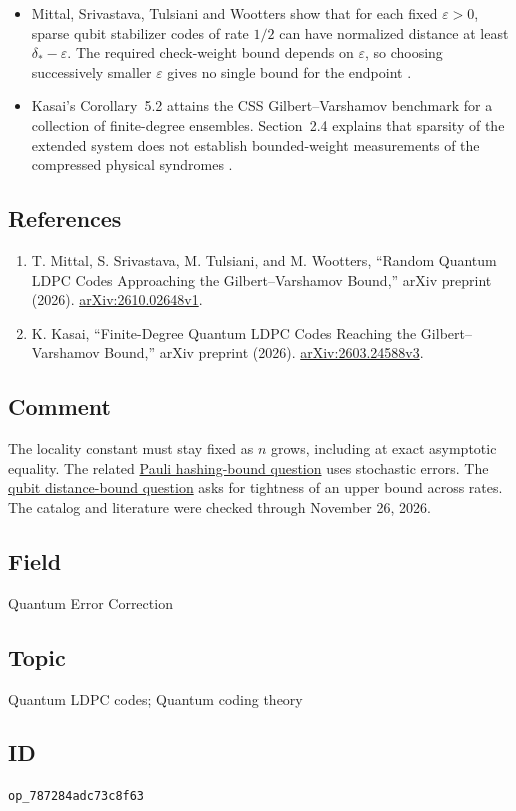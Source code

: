 \begin{itemize}
  \item Mittal, Srivastava, Tulsiani and Wootters show that for each fixed $\varepsilon>0$, sparse qubit stabilizer codes of rate $1/2$ can have normalized distance at least $\delta_*-\varepsilon$. The required check-weight bound depends on $\varepsilon$, so choosing successively smaller $\varepsilon$ gives no single bound for the endpoint .

  \item Kasai's Corollary~5.2 attains the CSS Gilbert--Varshamov benchmark for a collection of finite-degree ensembles. Section~2.4 explains that sparsity of the extended system does not establish bounded-weight measurements of the compressed physical syndromes .
\end{itemize}

\subsection*{References}

\begin{enumerate}[label={},leftmargin=4.8em,labelsep=0.5em]
  \footnotesize
  \item[\textup{[MSTW26]}]\label{ref:gvq-mstw}
  T. Mittal, S. Srivastava, M. Tulsiani, and M. Wootters, ``Random Quantum LDPC Codes Approaching the Gilbert--Varshamov Bound,'' arXiv preprint (2026). \href{https://arxiv.org/abs/2610.02648v1}{arXiv:2610.02648v1}.

  \item[\textup{[Kas26]}]\label{ref:gvq-kasai}
  K. Kasai, ``Finite-Degree Quantum LDPC Codes Reaching the Gilbert--Varshamov Bound,'' arXiv preprint (2026). \href{https://arxiv.org/abs/2603.24588v3}{arXiv:2603.24588v3}.
\end{enumerate}

\subsection*{Comment}

The locality constant must stay fixed as $n$ grows, including at exact asymptotic equality. The related \href{https://qiqc-op.com/problem/op_4830398d0c2feb5f/}{Pauli hashing-bound question} uses stochastic errors. The \href{https://qiqc-op.com/problem/op_edcb345719181830/}{qubit distance-bound question} asks for tightness of an upper bound across rates. The catalog and literature were checked through November 26, 2026.

\subsection*{Field}

Quantum Error Correction

\subsection*{Topic}

Quantum LDPC codes; Quantum coding theory

\subsection*{ID}

\texttt{op\_787284adc73c8f63}

